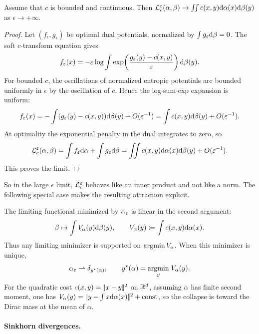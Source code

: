 \begin{prop}
		Assume that $c$ is bounded and continuous. Then $\mathcal{L}_c^\varepsilon(\alpha,\beta) \rightarrow \iint c(x,y)\mathrm{d}\alpha(x)\mathrm{d}\beta(y)$ as $\epsilon \rightarrow +\infty$.
\end{prop}
\begin{proof}
	Let $(f_\epsilon,g_\epsilon)$ be optimal dual potentials, normalized by $\int g_\varepsilon\mathrm{d}\beta=0$. The soft $c$-transform equation gives
	\[
		f_\varepsilon(x)
		=
		-\varepsilon\log\int
		\exp\!\left(\frac{g_\varepsilon(y)-c(x,y)}{\varepsilon}\right)\mathrm{d}\beta(y).
	\]
	For bounded $c$, the oscillations of normalized entropic potentials are bounded uniformly in $\epsilon$ by the oscillation of $c$. Hence the log-sum-exp expansion is uniform:
	\[
		f_\varepsilon(x)
		=
		-\int (g_\varepsilon(y)-c(x,y))\mathrm{d}\beta(y)+O(\varepsilon^{-1})
		=
		\int c(x,y)\mathrm{d}\beta(y)+O(\varepsilon^{-1}).
	\]
	At optimality the exponential penalty in the dual integrates to zero, so
	\[
		\mathcal{L}_c^\varepsilon(\alpha,\beta)
		=
		\int f_\varepsilon\mathrm{d}\alpha+\int g_\varepsilon\mathrm{d}\beta
		=
		\iint c(x,y)\mathrm{d}\alpha(x)\mathrm{d}\beta(y)+O(\varepsilon^{-1}).
	\]
	This proves the limit.
\end{proof}

So in the large $\epsilon$ limit, $\mathcal{L}_c^\varepsilon$ behaves like an inner product and not like a norm. The following special case makes the resulting attraction explicit.

\begin{example}
	The limiting functional minimized by $\alpha_\varepsilon$ is linear in the second argument:
	\[
		\beta\mapsto \int V_\alpha(y)\mathrm{d}\beta(y),
		\qquad
		V_\alpha(y)\coloneqq\int c(x,y)\mathrm{d}\alpha(x).
	\]
	Thus any limiting minimizer is supported on $\operatorname{argmin} V_\alpha$. When this minimizer is unique,
	\[
		\alpha_\varepsilon \rightharpoonup \delta_{y^\star(\alpha)},
		\qquad
		y^\star(\alpha)=\underset{y}{\operatorname{argmin}}\; V_\alpha(y).
	\]
	For the quadratic cost $c(x,y)=|\!| x-y |\!|^2$ on $\mathbb{R}^d$, assuming $\alpha$ has finite second moment, one has $V_\alpha(y)=|\!| y-\int x\mathrm{d}\alpha(x) |\!|^2+\mathrm{const}$, so the collapse is toward the Dirac mass at the mean of $\alpha$.
\end{example}

\paragraph{Sinkhorn divergences.}

